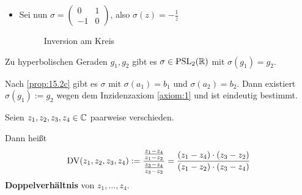\begin{beweis}
\begin{enumerate}[label=\alph*)]
\begin{itemize}
                \item Sei nun $\sigma = \begin{pmatrix}0 & 1\\-1 & 0\end{pmatrix}$, also $\sigma(z) = - \frac{1}{z}$
                    \begin{figure}[htp]
                        \centering
                        
                        \caption{Inversion am Kreis}
                        \label{fig:inversion-am-kreis}
                    \end{figure}
            \end{itemize}
    \end{enumerate}
\end{beweis}

\begin{bemerkung}%
    Zu hyperbolischen Geraden $g_1, g_2$ gibt es $\sigma \in \mathrm{PSL}_2(\mathbb{R})$
    mit $\sigma(g_1) = g_2$.
\end{bemerkung}
\begin{beweis}
    Nach \cref{prop:15.2c} gibt es $\sigma$ mit $\sigma(a_1) = b_1$
    und $\sigma(a_2) = b_2$. Dann existiert $\sigma(g_1) := g_2$
    wegen dem Inzidenzaxiom \ref{axiom:1} und ist eindeutig bestimmt.
\end{beweis}

\begin{definition}%
    Seien $z_1, z_2, z_3, z_4 \in \mathbb{C}$ paarweise verschieden.

    Dann heißt 
    \[\operatorname{DV}(z_1, z_2, z_3, z_4) := \frac{\frac{z_1 - z_4}{z_1 - z_2}}{\frac{z_3 - z_4}{z_3 - z_2}} = \frac{(z_1 - z_4) \cdot (z_3 - z_2)}{(z_1 - z_2) \cdot (z_3 - z_4)}\]
    \textbf{Doppelverhältnis} von 
    $z_1, \dots, z_4$.
\end{definition}

